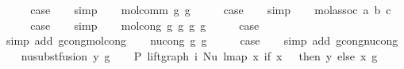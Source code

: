 \begin{isabellebody}
\ \ \isamarkupfalse%
\ \isamarkupfalse%
\ {\isacharquery}{\kern0pt}case\isanewline
\ \ \isamarkupfalse%
\ simp\isanewline
{}\isamarkupfalse%
\isanewline
\ \ \isamarkupfalse%
\ {\isacharparenleft}{\kern0pt}mol{\isacharunderscore}{\kern0pt}comm\ g{}\ g{}{\isacharparenright}{\kern0pt}\isanewline
\ \ \isamarkupfalse%
\ \isamarkupfalse%
\ {\isacharquery}{\kern0pt}case\isanewline
\ \ \isamarkupfalse%
\ simp\isanewline
{}\isamarkupfalse%
\isanewline
\ \ \isamarkupfalse%
\ {\isacharparenleft}{\kern0pt}mol{\isacharunderscore}{\kern0pt}assoc\ a\ b\ c{\isacharparenright}{\kern0pt}\isanewline
\ \ \isamarkupfalse%
\ \isamarkupfalse%
\ {\isacharquery}{\kern0pt}case\isanewline
\ \ \isamarkupfalse%
\ simp\isanewline
{}\isamarkupfalse%
\isanewline
\ \ \isamarkupfalse%
\ {\isacharparenleft}{\kern0pt}mol{\isacharunderscore}{\kern0pt}cong\ g{}\ g{}{\isacharprime}{\kern0pt}\ g{}\ g{}{\isacharprime}{\kern0pt}{\isacharparenright}{\kern0pt}\isanewline
\ \ \isamarkupfalse%
\ \isamarkupfalse%
\ {\isacharquery}{\kern0pt}case\isanewline
\ \ \isamarkupfalse%
\ {\isacharparenleft}{\kern0pt}simp\ add{\isacharcolon}{\kern0pt}\ gcong{\isachardot}{\kern0pt}mol{\isacharunderscore}{\kern0pt}cong{\isacharparenright}{\kern0pt}\isanewline
{}\isamarkupfalse%
\isanewline
\ \ \isamarkupfalse%
\ {\isacharparenleft}{\kern0pt}nu{\isacharunderscore}{\kern0pt}cong\ g\ g{\isacharprime}{\kern0pt}{\isacharparenright}{\kern0pt}\isanewline
\ \ \isamarkupfalse%
\ \isamarkupfalse%
\ {\isacharquery}{\kern0pt}case\isanewline
\ \ \isamarkupfalse%
\ {\isacharparenleft}{\kern0pt}simp\ add{\isacharcolon}{\kern0pt}\ gcong{\isachardot}{\kern0pt}nu{\isacharunderscore}{\kern0pt}cong{\isacharparenright}{\kern0pt}\isanewline
{}\isamarkupfalse%
\isanewline
\ \ \isamarkupfalse%
\ {\isacharparenleft}{\kern0pt}nu{\isacharunderscore}{\kern0pt}subst{\isacharunderscore}{\kern0pt}fusion{}\ y\ g{\isacharparenright}{\kern0pt}\isanewline
\ \ \isamarkupfalse%
\ P{}{\isacharcolon}{\kern0pt}\ {\isachardoublequoteopen}lift{\isacharunderscore}{\kern0pt}graph\ i\ {\isacharparenleft}{\kern0pt}Nu\ {\isacharparenleft}{\kern0pt}lmap\ {\isacharparenleft}{\kern0pt}{\isasymlambda}x{\isachardot}{\kern0pt}\ if\ x\ {\isacharequal}{\kern0pt}\ {}\ then\ y\ else\ x{\isacharparenright}{\kern0pt}\ g{\isacharparenright}{\kern0pt}{\isacharparenright}{\kern0pt}\ {\isacharequal}{\kern0pt}\isanewline

\end{isabellebody}
